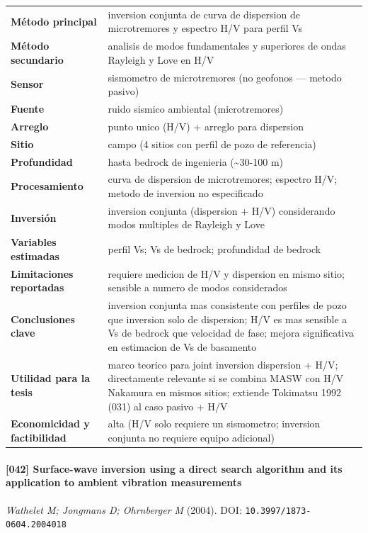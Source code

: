 \begin{center}\scriptsize
\begin{tabularx}{\textwidth}{@{}>{\bfseries}p{3.3cm} X@{}}
\toprule
M\'etodo principal & inversion conjunta de curva de dispersion de microtremores y espectro H/V para perfil Vs \\
M\'etodo secundario & analisis de modos fundamentales y superiores de ondas Rayleigh y Love en H/V \\
Sensor & sismometro de microtremores (no geofonos --- metodo pasivo) \\
Fuente & ruido sismico ambiental (microtremores) \\
Arreglo & punto unico (H/V) + arreglo para dispersion \\
Sitio & campo (4 sitios con perfil de pozo de referencia) \\
Profundidad & hasta bedrock de ingenieria (\textasciitilde{}30-100 m) \\
Procesamiento & curva de dispersion de microtremores; espectro H/V; metodo de inversion no especificado \\
Inversi\'on & inversion conjunta (dispersion + H/V) considerando modos multiples de Rayleigh y Love \\
Variables estimadas & perfil Vs; Vs de bedrock; profundidad de bedrock \\
Limitaciones reportadas & requiere medicion de H/V y dispersion en mismo sitio; sensible a numero de modos considerados \\
Conclusiones clave & inversion conjunta mas consistente con perfiles de pozo que inversion solo de dispersion; H/V es mas sensible a Vs de bedrock que velocidad de fase; mejora significativa en estimacion de Vs de basamento \\
Utilidad para la tesis & marco teorico para joint inversion dispersion + H/V; directamente relevante si se combina MASW con H/V Nakamura en mismos sitios; extiende Tokimatsu 1992 (031) al caso pasivo + H/V \\
Economicidad y factibilidad & alta (H/V solo requiere un sismometro; inversion conjunta no requiere equipo adicional) \\
\bottomrule
\end{tabularx}
\end{center}

\paragraph{[042] Surface-wave inversion using a direct search algorithm and its application to ambient vibration measurements} \emph{Wathelet M; Jongmans D; Ohrnberger M} (2004).
{\scriptsize DOI: \texttt{10.3997/1873-0604.2004018}}

